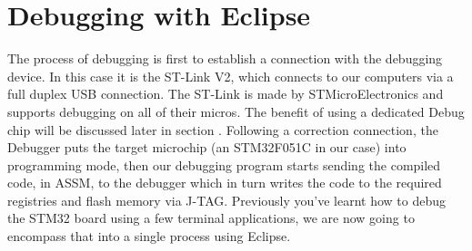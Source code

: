 {\section{Debugging with Eclipse}
\label{sec:Debug}
The process of debugging is first to establish a connection with the debugging device. In this case it is the ST-Link V2, which connects to our computers via a full duplex USB connection. The ST-Link is made by STMicroElectronics and supports debugging on all of their micros. The benefit of using a dedicated Debug chip will be discussed later in section \cite{sec:}. Following a correction connection, the Debugger puts the target microchip (an STM32F051C in our case) into programming mode, then our debugging program starts sending the compiled code, in ASSM, to the debugger which in turn writes the code to the required registries and flash memory via J-TAG. Previously you've learnt how to debug the STM32 board using a few terminal applications, we are now going to encompass that into a single process using Eclipse.
\\
}
